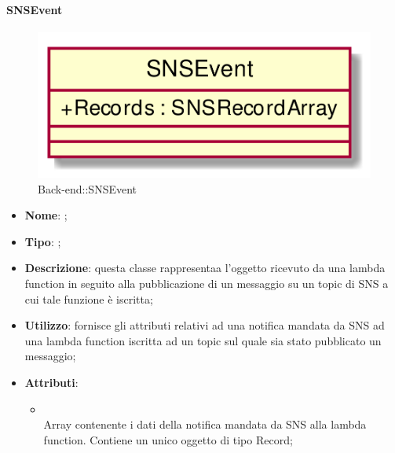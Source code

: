 \hypertarget{SNSEvent_label}{\paragraph{SNSEvent}}
\begin{figure}[h]
	\centering
	\includegraphics[width=\textwidth,height=\textheight,keepaspectratio]{images/ClassSNSEvent.png}
	\caption{Back-end::SNSEvent}
\end{figure}
\begin{itemize}
	\item \textbf{Nome}: ;
	\item \textbf{Tipo}: ;
	\item \textbf{Descrizione}: questa classe rappresentaa l'oggetto ricevuto da una lambda function in seguito alla pubblicazione di un messaggio su un topic di SNS a cui tale funzione è iscritta;
	\item \textbf{Utilizzo}: fornisce gli attributi relativi ad una notifica mandata da SNS ad una lambda function iscritta ad un topic sul quale sia stato pubblicato un messaggio;
	\item \textbf{Attributi}:
	\begin{itemize}
		\item[]  \\
		Array contenente i dati della notifica mandata da SNS alla lambda function. Contiene un unico oggetto di tipo Record;
	\end{itemize}
\end{itemize}


